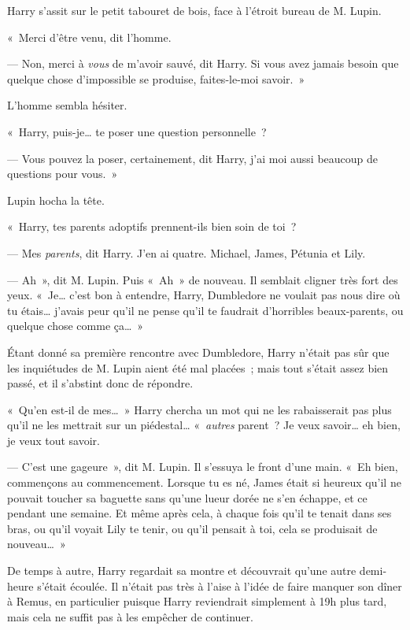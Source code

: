 Harry s'assit sur le petit tabouret de bois, face à l'étroit bureau de M. Lupin.

«~Merci d'être venu, dit l'homme.

--- Non, merci à \emph{vous} de m'avoir sauvé, dit Harry. Si vous avez jamais besoin que quelque chose d'impossible se produise, faites-le-moi savoir.~»

L'homme sembla hésiter.

«~Harry, puis-je… te poser une question personnelle~?

--- Vous pouvez la poser, certainement, dit Harry, j'ai moi aussi beaucoup de questions pour vous.~»

Lupin hocha la tête.

«~Harry, tes parents adoptifs prennent-ils bien soin de toi~?

--- Mes \emph{parents}, dit Harry. J'en ai quatre. Michael, James, Pétunia et Lily.

--- Ah~», dit M. Lupin. Puis «~Ah~» de nouveau. Il semblait cligner très fort des yeux. «~Je… c'est bon à entendre, Harry, Dumbledore ne voulait pas nous dire où tu étais… j'avais peur qu'il ne pense qu'il te faudrait d'horribles beaux-parents, ou quelque chose comme ça…~»

Étant donné sa première rencontre avec Dumbledore, Harry n'était pas sûr que les inquiétudes de M. Lupin aient été mal placées~; mais tout s'était assez bien passé, et il s'abstint donc de répondre.

«~Qu'en est-il de mes…~» Harry chercha un mot qui ne les rabaisserait pas plus qu'il ne les mettrait sur un piédestal… «~\emph{autres} parent~? Je veux savoir… eh bien, je veux tout savoir.

--- C'est une gageure~», dit M. Lupin. Il s'essuya le front d'une main. «~Eh bien, commençons au commencement. Lorsque tu es né, James était si heureux qu'il ne pouvait toucher sa baguette sans qu'une lueur dorée ne s'en échappe, et ce pendant une semaine. Et même après cela, à chaque fois qu'il te tenait dans ses bras, ou qu'il voyait Lily te tenir, ou qu'il pensait à toi, cela se produisait de nouveau…~»

\later

De temps à autre, Harry regardait sa montre et découvrait qu'une autre demi-heure s'était écoulée. Il n'était pas très à l'aise à l'idée de faire manquer son dîner à Remus, en particulier puisque Harry reviendrait simplement à 19h plus tard, mais cela ne suffit pas à les empêcher de continuer.

